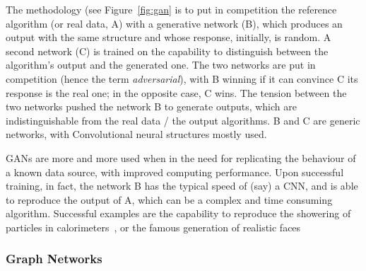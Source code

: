 The methodology (see Figure~\ref{fig:gan} is to put in competition the reference algorithm (or real data, A) with a generative network (B), which produces an output with the same structure and whose response, initially, is random. A second network (C) is trained on the capability to distinguish between the algorithm's output and the generated one. The two networks are put in competition (hence the term \emph{adversarial}), with B winning if it can convince C its response is the real one; in the opposite case, C wins.
The tension between the two networks pushed the network B to generate outputs, which are indistinguishable from the real data / the output algorithms. B and C are generic networks, with Convolutional neural structures mostly used.

GANs are more and more used when in the need for replicating the behaviour of a known data source, with improved computing performance. Upon successful training, in fact, the network B has the typical speed of (say) a CNN, and is able to reproduce the output of A, which can be a complex and time consuming algorithm. Successful examples are the capability to reproduce the showering of particles in calorimeters~\cite{atlascalogan, cmscalogan}, or the famous generation of realistic faces~\cite{faces}


\subsubsection{Graph Networks}




